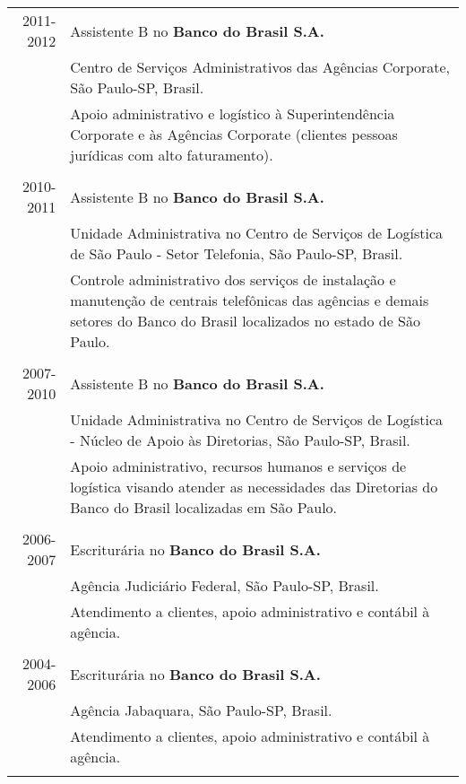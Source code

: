 \documentclass[a4paper,10pt]{article} %
\begin{document}
\begin{tabular}{r|p{11cm}}

\textsc{2011-2012} & Assistente B no \textbf{Banco do Brasil S.A.}\\
& Centro de Serviços Administrativos das Agências Corporate, São Paulo-SP, Brasil. \emph{}\\
& \footnotesize{Apoio administrativo e logístico à Superintendência Corporate e às Agências Corporate (clientes pessoas jurídicas com alto faturamento).}\\
\multicolumn{2}{c}{} \\


\textsc{2010-2011} & Assistente B no \textbf{Banco do Brasil S.A.}\\
& Unidade Administrativa no Centro de Serviços de Logística de São Paulo - Setor Telefonia, S\~ao Paulo-SP, Brasil.\emph{}\\
& \footnotesize{Controle administrativo dos serviços de instalação e manutenção de centrais telefônicas das agências e demais setores do Banco do Brasil localizados no estado de São Paulo.}\\	
	\multicolumn{2}{c}{} \\
	

\textsc{2007-2010} & Assistente B no \textbf{Banco do Brasil S.A.}\\
& Unidade Administrativa no Centro de Serviços de Logística - Núcleo de Apoio às Diretorias, S\~ao Paulo-SP, Brasil.\emph{}\\
       & \footnotesize{Apoio administrativo, recursos humanos e serviços de logística visando atender as necessidades das Diretorias do Banco do Brasil localizadas em São Paulo.}\\       
	\multicolumn{2}{c}{} \\
	

\textsc{2006-2007} & Escriturária no \textbf{Banco do Brasil S.A.}\\
& Agência Judiciário Federal, São Paulo-SP, Brasil.\emph{}\\
       & \footnotesize{Atendimento a clientes, apoio administrativo e contábil à agência.}\\
       \multicolumn{2}{c}{} \\


\textsc{2004-2006} & Escriturária no \textbf{Banco do Brasil S.A.}\\
& Agência Jabaquara, São Paulo-SP, Brasil.\emph{}\\
& \footnotesize{Atendimento a clientes, apoio administrativo e contábil à agência.} \\
       \multicolumn{2}{c}{} \\

\end{tabular}
\end{document}
